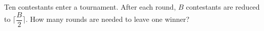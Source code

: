 Ten contestants enter a tournament. After each round, $ B $ contestants are reduced to $\lceil\dfrac{B}{2}\rceil $. How many rounds are needed to leave one winner?
